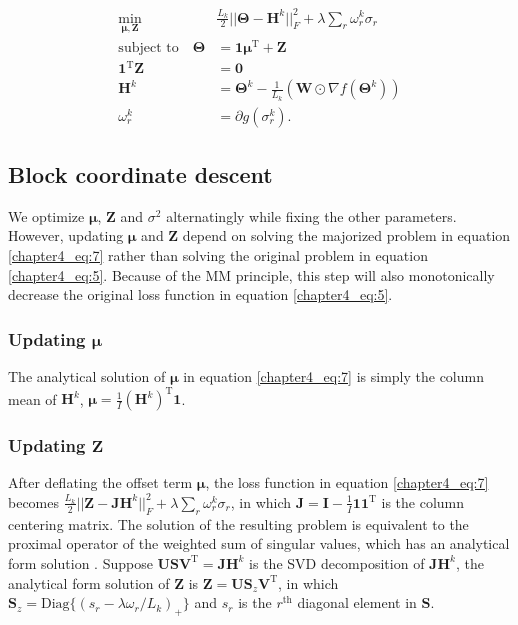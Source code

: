 \begin{equation}\label{chapter4_eq:7}
\begin{aligned}
\min_{\bm{\mu},\mathbf{Z}} \quad & \frac{L_k}{2}||\mathbf{\Theta}-\mathbf{H}^{k}||_F^2 + \lambda \sum_{r} \omega_r^k\sigma_{r}\\
           \text{subject to} \quad   \mathbf{\Theta} &= \mathbf{1}\bm{\mu}^{\text{T}} + \mathbf{Z}\\
                               \mathbf{1}^{\text{T}}\mathbf{Z} &= \mathbf{0} \\
                               \mathbf{H}^k &= \mathbf{\Theta}^k - \frac{1}{L_k} (\mathbf{W}\odot \nabla f(\mathbf{\Theta}^k)) \\
                               \omega_r^k &= \partial g(\sigma_r^k).
\end{aligned}
\end{equation}

\subsection{Block coordinate descent}
We optimize $\bm{\mu}$, $\mathbf{Z}$ and $\sigma^2$ alternatingly while fixing the other parameters. However, updating $\bm{\mu}$ and $\mathbf{Z}$ depend on solving the majorized problem in equation \ref{chapter4_eq:7} rather than solving the original problem in equation \ref{chapter4_eq:5}. Because of the MM principle, this step will also monotonically decrease the original loss function in equation \ref{chapter4_eq:5}.

\subsubsection*{Updating $\bm{\mu}$}
The analytical solution of $\bm{\mu}$ in equation \ref{chapter4_eq:7} is simply the column mean of $\mathbf{H}^k$, $\bm{\mu} = \frac{1}{I} (\mathbf{H}^k)^{\text{T}} \mathbf{1}$.

\subsubsection*{Updating $\mathbf{Z}$}
After deflating the offset term $\bm{\mu}$, the loss function in equation \ref{chapter4_eq:7} becomes $\frac{L_k}{2} ||\mathbf{Z} - \mathbf{J} \mathbf{H}^k||_F^2 + \lambda \sum_{r}\omega_{r}^k \sigma_r$, in which $\mathbf{J} = \mathbf{I} - \frac{1}{I} \mathbf{1} \mathbf{1}^{\text{T}}$ is the column centering matrix. The solution of the resulting problem is equivalent to the proximal operator of the weighted sum of singular values, which has an analytical form solution \cite{lu2015generalized}. Suppose $\mathbf{USV}^{\text{T}} = \mathbf{J} \mathbf{H}^k$ is the SVD decomposition of $\mathbf{J} \mathbf{H}^k$, the analytical form solution of $\mathbf{Z}$ is $\mathbf{Z} = \mathbf{US}_{z}\mathbf{V}^{\text{T}}$, in which $\mathbf{S}_{z} = \text{Diag}\{(s_{r}-\lambda \omega_r /L_k)_{+}\}$ and $s_{r}$ is the $r^{\text{th}}$ diagonal element in $\mathbf{S}$.

